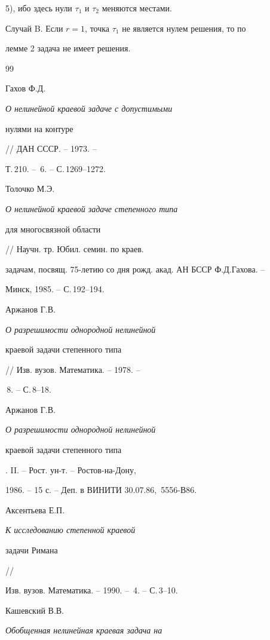5), ибо здесь нули $\tau_1$ и $\tau_2$ меняются местами.


\smallskip





Случай B. Если $r=1$, точка $\tau_1$ не является нулем решения, то по


лемме 2 задача не имеет решения.





\begin{thebibliography}{99}







Гахов Ф.Д. {\em О нелинейной краевой задаче с допустимыми


нулями на контуре} // ДАН СССР. -- 1973. --


Т.\,210. -- \No\,6. -- С.\,1269--1272.




Толочко М.Э. {\em О нелинейной краевой задаче степенного типа


для многосвязной области} // Научн. тр. Юбил. семин. по краев.


задачам, посвящ. 75-летию со дня рожд. акад. АН БССР Ф.Д.Гахова. --


Минск, 1985. -- С.\,192--194.




Аржанов Г.В. {\em О разрешимости однородной нелинейной


краевой задачи степенного типа} // Изв. вузов. Математика. -- 1978. -- 


\No\,8. -- С.\,8--18.




Аржанов Г.В. {\em О разрешимости однородной нелинейной


краевой задачи степенного типа}. II. -- Рост. ун-т. -- Ростов-на-Дону,


1986. -- 15 с. -- Деп. в ВИНИТИ 30.07.86, \No\,5556-В86.




Аксентьева Е.П. {\em К исследованию степенной краевой


задачи Римана} //


Изв. вузов. Математика. -- 1990. -- \No\,4. -- С.\,3--10.




Кашевский В.В. {\em Обобщенная нелинейная краевая задача на


}
\end{thebibliography}
